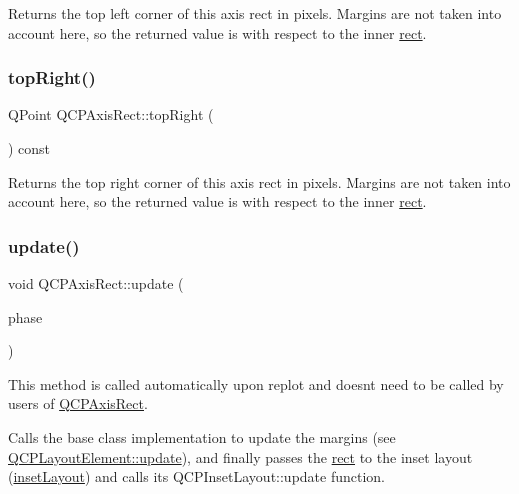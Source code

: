 Returns the top left corner of this axis rect in pixels. Margins are not taken into account here, so the returned value is with respect to the inner \mbox{\hyperlink{class_q_c_p_layout_element_a208effccfe2cca4a0eaf9393e60f2dd4}{rect}}. \mbox{\label{class_q_c_p_axis_rect_a7aa221967549ba71b98c465bf8234758}} 
\subsubsection{\texorpdfstring{topRight()}{topRight()}}
{\footnotesize\ttfamily Q\+Point Q\+C\+P\+Axis\+Rect\+::top\+Right (\begin{DoxyParamCaption}{ }\end{DoxyParamCaption}) const\hspace{0.3cm}{\ttfamily [inline]}}

Returns the top right corner of this axis rect in pixels. Margins are not taken into account here, so the returned value is with respect to the inner \mbox{\hyperlink{class_q_c_p_layout_element_a208effccfe2cca4a0eaf9393e60f2dd4}{rect}}. \mbox{\label{class_q_c_p_axis_rect_add049d464b9ef2ccdc638adc4ccb4aca}} 
\subsubsection{\texorpdfstring{update()}{update()}}
{\footnotesize\ttfamily void Q\+C\+P\+Axis\+Rect\+::update (\begin{DoxyParamCaption}\item[{\mbox{\hyperlink{class_q_c_p_layout_element_a0d83360e05735735aaf6d7983c56374d}{Update\+Phase}}}]{phase }\end{DoxyParamCaption})\hspace{0.3cm}{\ttfamily [virtual]}}

This method is called automatically upon replot and doesn\textquotesingle{}t need to be called by users of \mbox{\hyperlink{class_q_c_p_axis_rect}{Q\+C\+P\+Axis\+Rect}}.

Calls the base class implementation to update the margins (see \mbox{\hyperlink{class_q_c_p_layout_element_a929c2ec62e0e0e1d8418eaa802e2af9b}{Q\+C\+P\+Layout\+Element\+::update}}), and finally passes the \mbox{\hyperlink{class_q_c_p_layout_element_a208effccfe2cca4a0eaf9393e60f2dd4}{rect}} to the inset layout (\mbox{\hyperlink{class_q_c_p_axis_rect_a949f803466619924c7018df4b511ae10}{inset\+Layout}}) and calls its Q\+C\+P\+Inset\+Layout\+::update function.

